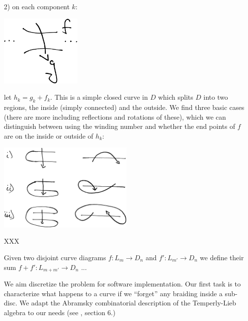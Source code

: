 \documentclass[12pt,a4paper]{article}
\begin{document}
2) on each component $k$:

\begin{center}
\includegraphics[width=0.3\textwidth]{snake-component.eps}
\end{center}

let $h_k = g_k + f_k.$
This is a simple closed curve in $D$ which splits $D$
into two regions, the inside (simply connected) and the
outside.
We find three basic cases (there are more including reflections
and rotations of these), which we can distinguish between
using the winding number and whether the end points
of $f$ are on the inside or outside of $h_k$:

\begin{center}
\includegraphics[width=0.5\textwidth]{snake-cases.eps}
\end{center}

XXX



Given two disjoint curve diagrams $f:L_m\to D_n$ and $f':L_{m'}\to D_n$
we define their sum  $f+f':L_{m+m'}\to D_n$ ...




We aim discretize the problem for software implementation.
Our first task is to characterize what happens to a curve
if we ``forget'' any braiding inside a sub-disc.
We adapt the Abramsky combinatorial description 
of the Temperly-Lieb algebra to our needs
(see \cite{Abramsky08}, section 6.) %
\end{document}
